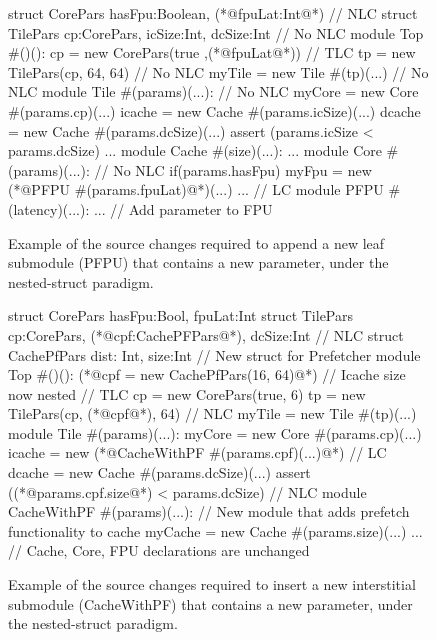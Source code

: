 \begin{figure}
\centering
\begin{phdl}
struct CorePars {hasFpu:Boolean, (*@\textcolor[rgb]{1,0,0}{fpuLat:Int}@*)}                     // NLC
struct TilePars {cp:CorePars, icSize:Int, dcSize:Int}            // No NLC
module Top #()():
  cp = new CorePars(true ,(*@\textcolor[rgb]{1,0,0}{fpuLat}@*))                                // TLC
  tp = new TilePars(cp, 64, 64)                                  // No NLC
  myTile = new Tile #(tp)(...)                                   // No NLC
module Tile #(params)(...):                                      // No NLC
  myCore = new Core  #(params.cp)(...)                                                        
  icache = new Cache #(params.icSize)(...)
  dcache = new Cache #(params.dcSize)(...)
  assert (params.icSize < params.dcSize) ...
module Cache #(size)(...): ...
module Core #(params)(...):                                     // No NLC
  if(params.hasFpu) myFpu = new (*@\textcolor[rgb]{1,0,0}{PFPU \#(params.fpuLat)}@*)(...) ...   // LC
module PFPU #(latency)(...): ...     // Add parameter to FPU 
\end{phdl} 
\caption{Example of the source changes required to append a new leaf submodule (PFPU) that contains a new parameter,
under the nested-struct paradigm.}
\label{fig:nestedstruct-append}
\end{figure}

\begin{figure}
\centering
\begin{phdl}
struct CorePars {hasFpu:Bool, fpuLat:Int}
struct TilePars {cp:CorePars, (*@\textcolor[rgb]{1,0,0}{cpf:CachePFPars}@*), dcSize:Int}      // NLC
struct CachePfPars {dist: Int, size:Int} // New struct for Prefetcher
module Top #()():
  (*@\textcolor[rgb]{1,0,0}{cpf = new CachePfPars(16, 64)}@*)  // Icache size now nested      // TLC
  cp = new CorePars(true, 6)
  tp = new TilePars(cp, (*@\textcolor[rgb]{1,0,0}{cpf}@*), 64)                                // NLC
  myTile = new Tile #(tp)(...)
module Tile #(params)(...):
  myCore = new Core  #(params.cp)(...)
  icache = new (*@\textcolor[rgb]{1,0,0}{CacheWithPF \#(params.cpf)(...)}@*)                   // LC
  dcache = new Cache #(params.dcSize)(...)
  assert ((*@\textcolor[rgb]{1,0,0}{params.cpf.size}@*) < params.dcSize)                      // NLC
module CacheWithPF #(params)(...):  // New module that adds prefetch functionality to cache
  myCache = new Cache #(params.size)(...)
... // Cache, Core, FPU declarations are unchanged
\end{phdl} 
\caption{Example of the source changes required to insert a new interstitial submodule (CacheWithPF) that contains a new parameter,
under the nested-struct paradigm.}
\label{fig::nestedstruct-insert}
\end{figure}

